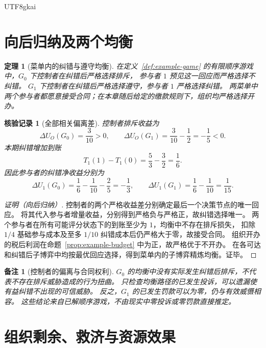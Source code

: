 \documentclass[12pt,a4paper,openany]{report}
\newtheorem{theorem}{定理}[chapter]
\newtheorem{remark}{备注}[chapter]
\newtheorem{Certificate}{核验记录}[chapter]
\begin{document}
\begin{CJK*}{UTF8}{gkai}
\section{向后归纳及两个均衡}

\begin{theorem}[菜单内的纠错与遵守均衡]
\label{thm:example-equilibrium}
在定义~\ref{def:example-game} 的有限顺序游戏中，$G_0$ 下控制者在纠错后严格选择排斥，
参与者 $1$ 预见这一回应而严格选择不纠错。
$G_1$ 下控制者在纠错后严格选择遵守，参与者 $1$ 严格选择纠错。
两菜单中两个参与者都愿意接受合同；在本章随后给定的缴款规则下，组织均严格选择开办。
\end{theorem}
\begin{Certificate}[全部相关偏离差]
控制者排斥收益为
\[
 \Delta U_O(G_0)=\frac3{10}>0,\qquad
 \Delta U_O(G_1)=\frac3{10}-\frac12=-\frac15<0.
\]
本期纠错增加到账
\[
 T_1(1)-T_1(0)=\frac53-\frac32=\frac16.
\]
因此参与者的纠错净收益分别为
\[
 \Delta U_1(G_0)=\frac16-\frac1{10}-\frac25=-\frac13,
 \qquad
 \Delta U_1(G_1)=\frac16-\frac1{10}=\frac1{15}.
\]
\end{Certificate}
\begin{proof}[证明（向后归纳）]
控制者的两个严格收益差分别确定最后一个决策节点的唯一回应。
将其代入参与者增量收益，分别得到严格负与严格正，故纠错选择唯一。
两个参与者在所有可能评分状态下的到账至少为 $1$，均衡中不存在排斥损失，
扣除 $1/4$ 基础参与成本及至多 $1/10$ 纠错成本后仍严格大于零，故接受合同。
组织开办的税后利润在命题~\ref{prop:example-budget} 中为正，故严格优于不开办。
在各可达和纠错后子博弈中均按最优回应选择，得到菜单内的子博弈精炼均衡。证毕。
\end{proof}

\begin{remark}[控制者的偏离与合同权利]
$G_0$ 的均衡中没有实际发生纠错后排斥，不代表不存在排斥威胁造成的行为扭曲。
只检查均衡路径的已发生投诉，可以遗漏使有益纠错不出现的可信威胁。
反之，$G_1$ 的已发生罚款可以为零，仍与有效威慑相容。
这些结论来自已解顺序游戏，不由现实中零投诉或零罚款直接推定。
\end{remark}

\section{组织剩余、救济与资源效果}


\end{CJK*}
\end{document}
